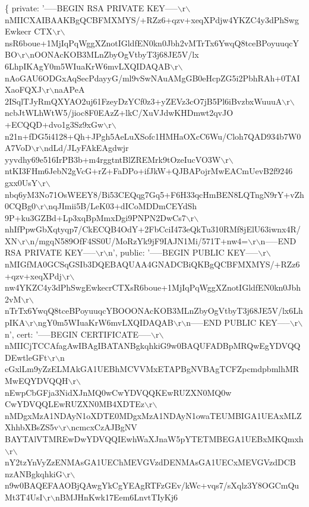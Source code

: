 \begin{DoxyCode}
\{
  private: '-----BEGIN RSA PRIVATE
       KEY-----\(\backslash\)r\(\backslash\)nMIICXAIBAAKBgQCBFMXMYS/+RZz6+qzv+xeqXPdjw4YKZC4y3dPhSwgEwkecr
      CTX\(\backslash\)r\(\backslash\)nsR6boue+1MjIqPqWggXZnotIGldfEN0kn0Jbh2vMTrTx6YwqQ8tceBPoyuuqcYBO\(\backslash\)r\(\backslash\)nOONAcKOB3MLnZbyOgVtbyT3j68JE5V/lx
      6LhpIKAgY0m5WIuaKrW6mvLXQIDAQAB\(\backslash\)r\(\backslash\)nAoGAU6ODGxAqSecPdayyG/ml9vSwNAuAMgGB0eHcpZG5i2PbhRAh+0TAIXaoFQXJ\(\backslash\)r\(\backslash\)naAPeA
      2ISqlTJyRmQXYAO2uj61FzeyDzYCf0z3+yZEVz3cO7jB5Pl6iBvzbxWuuuA\(\backslash\)r\(\backslash\)ncbJtWLhWtW5/jioc8F0EAzZ+lkC/XuVJdwKHDmwt2qvJO
      +ECQQD+dvo1g3Sz9xGw\(\backslash\)r\(\backslash\)n21n+fDG5i4128+Qh+JPgh5AeLuXSofc1HMHaOXcC6Wu/Cloh7QAD934b7W0A7VoD\(\backslash\)r\(\backslash\)ndLd/JLyFAkEAgdwjr
      yyvdhy69e516IrPB3b+m4rggtntBlZREMrk9tOzeIucVO3W\(\backslash\)r\(\backslash\)ntKI3FHm6JebN2gVcG+rZ+FaDPo+ifJkW+QJBAPojrMwEACmUevB2f9246
      gxx0UsY\(\backslash\)r\(\backslash\)nbq6yM3No71OsWEEY8/Bi53CEQqg7Gq5+F6H33qcHmBEN8LQTngN9rY+vZh0CQBg0\(\backslash\)r\(\backslash\)nqJImii5B/LeK03+dICoMDDmCEYdSh
      9P+ku3GZBd+Lp3xqBpMmxDgi9PNPN2DwCs7\(\backslash\)r\(\backslash\)nhIfPpwGbXqtyqp7/CkECQB4OdY+2FbCciI473eQkTu310RMf8jElU63iwnx4R/XN\(\backslash\)r\(\backslash\)n/mgqN589OfF4SS0U/MoRzYk9jF9IAJN1Mi/571T+nw4=\(\backslash\)r\(\backslash\)n-----END RSA PRIVATE KEY-----\(\backslash\)r\(\backslash\)n',
  public: '-----BEGIN PUBLIC
       KEY-----\(\backslash\)r\(\backslash\)nMIGfMA0GCSqGSIb3DQEBAQUAA4GNADCBiQKBgQCBFMXMYS/+RZz6+qzv+xeqXPdj\(\backslash\)r\(\backslash\)
      nw4YKZC4y3dPhSwgEwkecrCTXsR6boue+1MjIqPqWggXZnotIGldfEN0kn0Jbh2vM\(\backslash\)r\(\backslash\)nTrTx6YwqQ8tceBPoyuuqcYBOOONAcKOB3MLnZbyOgVtbyT3j68JE5V/lx6LhpIKA\(\backslash\)r\(\backslash\)ngY0m5WIuaKrW6mvLXQIDAQAB\(\backslash\)r\(\backslash\)n-----END PUBLIC KEY-----\(\backslash\)r\(\backslash\)n',
  cert: '-----BEGIN
       CERTIFICATE-----\(\backslash\)r\(\backslash\)nMIICjTCCAfagAwIBAgIBATANBgkqhkiG9w0BAQUFADBpMRQwEgYDVQQDEwtleGFt\(\backslash\)r\(\backslash\)n
      cGxlLm9yZzELMAkGA1UEBhMCVVMxETAPBgNVBAgTCFZpcmdpbmlhMRMwEQYDVQQH\(\backslash\)r\(\backslash\)nEwpCbGFja3NidXJnMQ0wCwYDVQQKEwRUZXN0MQ0w
      CwYDVQQLEwRUZXN0MB4XDTEz\(\backslash\)r\(\backslash\)nMDgxMzA1NDAyN1oXDTE0MDgxMzA1NDAyN1owaTEUMBIGA1UEAxMLZXhhbXBsZS5v\(\backslash\)r\(\backslash\)ncmcxCzAJBgNV
      BAYTAlVTMREwDwYDVQQIEwhWaXJnaW5pYTETMBEGA1UEBxMKQmxh\(\backslash\)r\(\backslash\)nY2tzYnVyZzENMAsGA1UEChMEVGVzdDENMAsGA1UECxMEVGVzdDCB
      nzANBgkqhkiG\(\backslash\)r\(\backslash\)n9w0BAQEFAAOBjQAwgYkCgYEAgRTFzGEv/kWc+vqs7/sXqlz3Y8OGCmQuMt3T4UsI\(\backslash\)r\(\backslash\)nBMJHnKwk17Eem6LnvtTIyKj6

\end{DoxyCode}
